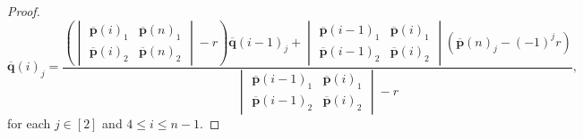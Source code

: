 \documentclass[10pt,a4paper]{amsart}
\begin{document}
\begin{proof}
\begin{equation}
        \overline{\mathbf{q}}(i)_j = \frac{\left(\begin{vmatrix} \overline{\mathbf{p}}(i)_1 & \overline{\mathbf{p}}(n)_1 \\ \overline{\mathbf{p}}(i)_2 & \overline{\mathbf{p}}(n)_2 \end{vmatrix} - r\right)\overline{\mathbf{q}}(i-1)_j + \begin{vmatrix} \overline{\mathbf{p}}(i-1)_1 & \overline{\mathbf{p}}(i)_1 \\ \overline{\mathbf{p}}(i-1)_2 & \overline{\mathbf{p}}(i)_2 \end{vmatrix}(\overline{\mathbf{p}}(n)_j - (-1)^jr)}{\begin{vmatrix} \overline{\mathbf{p}}(i-1)_1 & \overline{\mathbf{p}}(i)_1 \\ \overline{\mathbf{p}}(i-1)_2 & \overline{\mathbf{p}}(i)_2 \end{vmatrix} - r},
    \end{equation}
    for each $j\in[2]$ and $4\leq i \leq n-1$.


\end{proof}
\end{document}
